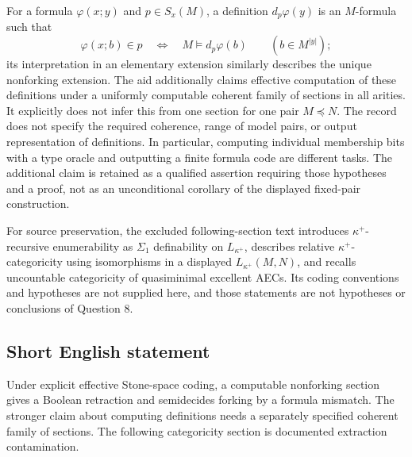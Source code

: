 \documentclass[11pt]{article}
\begin{document}
For a formula \(\varphi(x;y)\) and \(p\in S_x(M)\), a definition \(d_p\varphi(y)\) is an \(M\)-formula such that
\[
 \varphi(x;b)\in p\quad\Longleftrightarrow\quad
 M\models d_p\varphi(b)\qquad(b\in M^{|y|});
\]
its interpretation in an elementary extension similarly describes the unique nonforking extension. The aid additionally claims effective computation of these definitions under a uniformly computable coherent family of sections in all arities. It explicitly does not infer this from one section for one pair \(M\preccurlyeq N\). The record does not specify the required coherence, range of model pairs, or output representation of definitions. In particular, computing individual membership bits with a type oracle and outputting a finite formula code are different tasks. The additional claim is retained as a qualified assertion requiring those hypotheses and a proof, not as an unconditional corollary of the displayed fixed-pair construction.

For source preservation, the excluded following-section text introduces \(\kappa^+\)-recursive enumerability as \(\Sigma_1\) definability on \(L_{\kappa^+}\), describes relative \(\kappa^+\)-categoricity using isomorphisms in a displayed \(L_{\kappa^+}(M,N)\), and recalls uncountable categoricity of quasiminimal excellent AECs. Its coding conventions and hypotheses are not supplied here, and those statements are not hypotheses or conclusions of Question 8.
\subsection{Short English statement}
Under explicit effective Stone-space coding, a computable nonforking section gives a Boolean retraction and semidecides forking by a formula mismatch. The stronger claim about computing definitions needs a separately specified coherent family of sections. The following categoricity section is documented extraction contamination.
\end{document}

